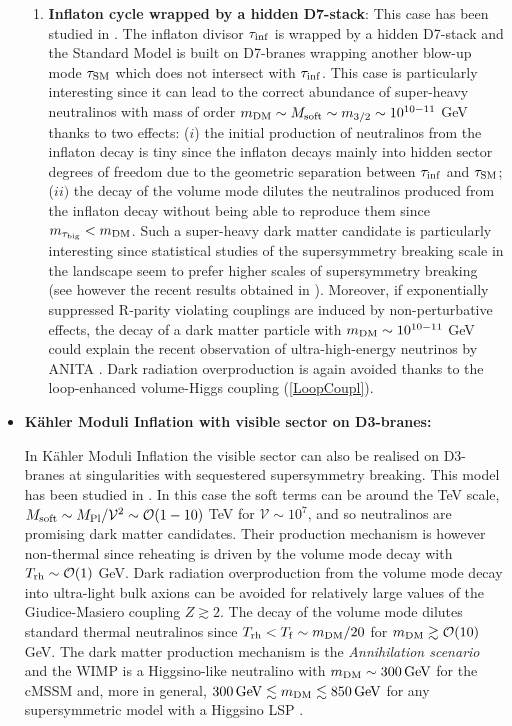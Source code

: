 \begin{itemize}
\begin{enumerate}
\item \textbf{Inflaton cycle wrapped by a hidden D7-stack}: This case has been studied in \cite{Allahverdi:2020uax}. The inflaton divisor $\tau_{\rm inf}$ is wrapped by a hidden D7-stack and the Standard Model is built on D7-branes wrapping another blow-up mode $\tau_{\rm SM}$ which does not intersect with $\tau_{\rm inf}$. This case is particularly interesting since it can lead to the correct abundance of super-heavy neutralinos with mass of order $m_{\rm DM}\sim M_{\rm soft}\sim m_{3/2}\sim 10^{10-11}$ GeV thanks to two effects: ($i$) the initial production of neutralinos from the inflaton decay is tiny since the inflaton decays mainly into hidden sector degrees of freedom due to the geometric separation between $\tau_{\rm inf}$ and $\tau_{\rm SM}$; ($ii)$ the decay of the volume mode dilutes the neutralinos produced from the inflaton decay without being able to reproduce them since $m_{\tau_{\rm big}}<m_{\rm DM}$. Such a super-heavy dark matter candidate is particularly interesting since statistical studies of the supersymmetry breaking scale in the landscape seem to prefer higher scales of supersymmetry breaking \cite{Denef:2004cf, Broeckel:2020fdz} (see however the recent results obtained in \cite{Cicoli:2022chj}). Moreover, if exponentially suppressed R-parity violating couplings are induced by non-perturbative effects, the decay of a dark matter particle with $m_{\rm DM}\sim 10^{10-11}$ GeV could explain the recent observation of ultra-high-energy neutrinos by ANITA \cite{Heurtier:2019git, Dudas:2020sbq}. Dark radiation overproduction is again avoided thanks to the loop-enhanced volume-Higgs coupling (\ref{LoopCoupl}). 
\end{enumerate}

\item \textbf{K\"ahler Moduli Inflation with visible sector on D3-branes:} 

In K\"ahler Moduli Inflation the visible sector can also be realised on D3-branes at singularities with sequestered supersymmetry breaking. This model has been studied in \cite{Cicoli:2010yj, Cicoli:2012aq, 12083563, Allahverdi:2013noa, Allahverdi:2014ppa, Cicoli:2015bpq}. In this case the soft terms can be around the TeV scale, $M_{\rm soft}\sim M_{\rm Pl}/\mathcal{V}^2\sim \mathcal{O}(1-10)$ TeV for $\mathcal{V}\sim 10^7$, and so neutralinos are promising dark matter candidates. Their production mechanism is however non-thermal since reheating is driven by the volume mode decay with $T_{\rm rh}\sim\mathcal{O}(1)$ GeV. Dark radiation overproduction from the volume mode decay into ultra-light bulk axions can be avoided for relatively large values of the Giudice-Masiero coupling $Z\gtrsim 2$. The decay of the volume mode dilutes standard thermal neutralinos since $T_{\rm rh}< T_{\rm f}\sim m_{\rm DM}/20$ for $m_{\rm DM}\gtrsim \mathcal{O}(10)$ GeV. The dark matter production mechanism is the \emph{Annihilation scenario} and the WIMP is a Higgsino-like neutralino with $m_{\rm DM}\sim 300\,{\rm GeV}$ for the cMSSM \cite{Aparicio:2015sda} and, more in general, $300 \,{\rm GeV}\lesssim m_{\rm DM}\lesssim 850\,{\rm GeV}$ for any supersymmetric model with a Higgsino LSP \cite{Aparicio:2016qqb}.
\end{itemize}


